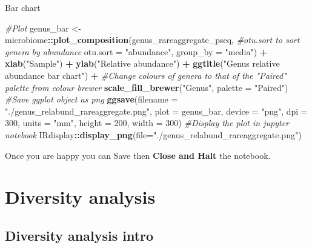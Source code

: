 \documentclass[
]{book}
\newenvironment{Shaded}{\begin{snugshade}}{\end{snugshade}}
\newcommand{\AttributeTok}[1]{\textcolor[rgb]{0.13,0.29,0.53}{#1}}
\newcommand{\CommentTok}[1]{\textcolor[rgb]{0.56,0.35,0.01}{\textit{#1}}}
\newcommand{\DecValTok}[1]{\textcolor[rgb]{0.00,0.00,0.81}{#1}}
\newcommand{\FunctionTok}[1]{\textcolor[rgb]{0.13,0.29,0.53}{\textbf{#1}}}
\newcommand{\NormalTok}[1]{#1}
\newcommand{\OtherTok}[1]{\textcolor[rgb]{0.56,0.35,0.01}{#1}}
\newcommand{\SpecialCharTok}[1]{\textcolor[rgb]{0.81,0.36,0.00}{\textbf{#1}}}
\newcommand{\StringTok}[1]{\textcolor[rgb]{0.31,0.60,0.02}{#1}}
\begin{document}
Bar chart

\begin{Shaded}
\begin{Highlighting}[]
\CommentTok{\#Plot}
\NormalTok{genus\_bar }\OtherTok{\textless{}{-}} 
\NormalTok{  microbiome}\SpecialCharTok{::}\FunctionTok{plot\_composition}\NormalTok{(genus\_rareaggregate\_pseq,}
                               \CommentTok{\#otu.sort to sort genera by abundance}
                               \AttributeTok{otu.sort =} \StringTok{"abundance"}\NormalTok{, }\AttributeTok{group\_by =} \StringTok{"media"}\NormalTok{) }\SpecialCharTok{+}
  \FunctionTok{xlab}\NormalTok{(}\StringTok{"Sample"}\NormalTok{) }\SpecialCharTok{+} \FunctionTok{ylab}\NormalTok{(}\StringTok{"Relative abundance"}\NormalTok{) }\SpecialCharTok{+}
  \FunctionTok{ggtitle}\NormalTok{(}\StringTok{"Genus relative abundance bar chart"}\NormalTok{) }\SpecialCharTok{+}
  \CommentTok{\#Change colours of genera to that of the "Paired" palette from colour brewer}
  \FunctionTok{scale\_fill\_brewer}\NormalTok{(}\StringTok{"Genus"}\NormalTok{, }\AttributeTok{palette =} \StringTok{"Paired"}\NormalTok{)}
\CommentTok{\#Save ggplot object as png}
\FunctionTok{ggsave}\NormalTok{(}\AttributeTok{filename =} \StringTok{"./genus\_relabund\_rareaggregate.png"}\NormalTok{, }\AttributeTok{plot =}\NormalTok{ genus\_bar,}
       \AttributeTok{device =} \StringTok{"png"}\NormalTok{, }\AttributeTok{dpi =} \DecValTok{300}\NormalTok{, }\AttributeTok{units =} \StringTok{"mm"}\NormalTok{, }\AttributeTok{height =} \DecValTok{200}\NormalTok{, }\AttributeTok{width =} \DecValTok{300}\NormalTok{)}
\CommentTok{\#Display the plot in jupyter notebook}
\NormalTok{IRdisplay}\SpecialCharTok{::}\FunctionTok{display\_png}\NormalTok{(}\AttributeTok{file=}\StringTok{"./genus\_relabund\_rareaggregate.png"}\NormalTok{)}
\end{Highlighting}
\end{Shaded}

Once you are happy you can Save then \textbf{Close and Halt} the notebook.

\hypertarget{part-diversity-analysis}{%
\part*{Diversity analysis}\label{part-diversity-analysis}}

\hypertarget{divsection}{%
\chapter{Diversity analysis intro}\label{divsection}}
\end{document}
